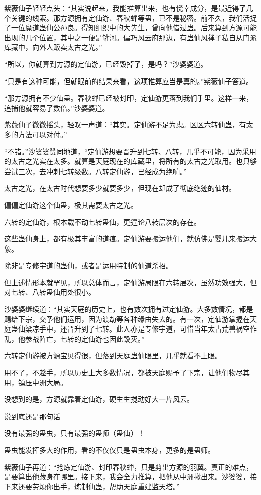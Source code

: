 \begin{this_body}
紫薇仙子轻轻点头：“其实说起来，我能推算出来，也有侥幸成分，是最近得了几个关键的线索。那方源拥有定仙游、春秋蝉等蛊，已不是秘密。前不久，我们活捉了一位魔道蛊仙公孙良。得知组织中的大先生，曾向他借过蛊。后来算到方源可能出现的几个位置，其中之一便是罐河。偏巧风云府那边，有蛊仙风禅子私自从门派库藏中，向外人贩卖太古之光。”

“所以，你就算到方源的定仙游，已经毁掉了，是吗？”沙婆婆道。

“只是有这种可能，但就眼前的结果来看，这项推算应当是真的。”紫薇仙子答道。

“那方源拥有不少仙蛊。春秋蝉已经被封印，定仙游更落到我们手里。这样一来，追捕他就容易了数倍。”沙婆婆道。

紫薇仙子微微摇头，轻叹一声道：“其实。定仙游不足为虑。区区六转仙蛊，有太多的方法可以对付。”

“不错。”沙婆婆赞同地道，“定仙游想要晋升到七转、八转，几乎不可能，因为采用的太古之光实在太多。就算是天庭现在的库藏里，将所有的太古之光取用。也只够尝试三次，去冲刺七转级数。八转定仙游，已经成为绝响。”

太古之光，在太古时代想要多少就要多少，但现在却成了彻底绝迹的仙材。

偏偏定仙游这个仙蛊，极其需要太古之光。

六转的定仙游，根本载不动七转蛊仙，更遑论八转层次的存在。

这些蛊仙身上，都有极其丰富的道痕。定仙游要搬运他们，就仿佛是婴儿来搬运大象。

除非是专修宇道的蛊仙，或者是运用特制的仙道杀招。

但上述情形本就罕见，所以总体而言，定仙游局限在六转层次，虽然功效强大，但对七转、八转蛊仙用处很小。

沙婆婆继续道：“其实天庭的历史上，也有数次拥有过定仙游。大多数情况，都是赐给下宗，交予他们运用，因为渡劫等各种缘由失去的。有一次，定仙游掌握在天庭蛊仙梁凉手中，还晋升到了七转。此人亦是专修宇道，可惜当年太古荒兽祸空作乱，他参战阵亡，七转的定仙游也因此毁灭。”

六转定仙游被方源宝贝得很，但落到天庭蛊仙眼里，几乎就看不上眼。

用不了，不趁手，所以历史上大多数情况，都被天庭赐予了下宗，让他们物尽其用，镇压中洲大局。

没想到的是，方源就靠着定仙游，硬生生搅动好大一片风云。

说到底还是那句话

没有最强的蛊虫，只有最强的蛊师（蛊仙）！

蛊虫能发挥多大的作用，看的不仅仅只是蛊虫本身，更多的是蛊师。

紫薇仙子再道：“抢炼定仙游、封印春秋蝉，只是剪出方源的羽翼。真正的难点，是要算出他藏身在哪里。接下来，我会全力推算，把他从中洲揪出来。沙婆婆，接下来还要劳烦你出手，炼制仙蛊，帮助天庭重建监天塔。”


\end{this_body}
